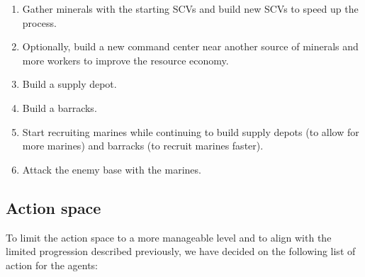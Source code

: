 \begin{enumerate}
    \item Gather minerals with the starting SCVs and build new SCVs to speed up the process.
    \item Optionally, build a new command center near another source of minerals and more workers to improve the resource economy.
    \item Build a supply depot.
    \item Build a barracks.
    \item Start recruiting marines while continuing to build supply depots (to allow for more marines) and barracks (to recruit marines faster).
    \item Attack the enemy base with the marines.
\end{enumerate}

\subsection{Action space}
\label{sec:action_space}

To limit the action space to a more manageable level and to align with the limited progression described previously, we have decided on the following list of action for the agents:


